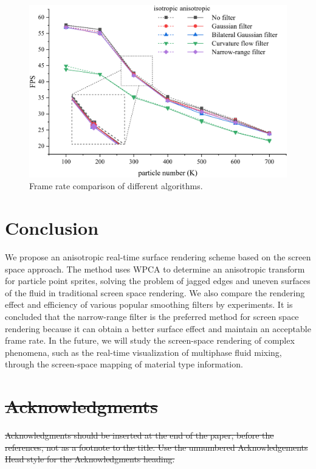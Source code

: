 \documentclass[times,twocolumn,final]{elsarticle}
\providecommand{\DIFdeltex}[1]{{\protect\color{red}\sout{#1}}}                      %
\providecommand{\DIFdelbegin}{} %
\providecommand{\DIFdelend}{} %
\providecommand{\DIFdel}[1]{\texorpdfstring{\DIFdeltex{#1}}{}} %
\begin{document}
\begin{figure}[!t]
    \centering
    \includegraphics[width=\linewidth]{figs/FPS.png}
    \caption{Frame rate comparison of different algorithms.}
    \label{fig:figure8}
\end{figure}

\section{Conclusion}
We propose an anisotropic real-time surface rendering scheme based on the screen space approach. The method uses WPCA to determine an anisotropic transform for particle point sprites, solving the problem of jagged edges and uneven surfaces of the fluid in traditional screen space rendering. We also compare the rendering effect and efficiency of various popular smoothing filters by experiments. It is concluded that the narrow-range filter is the preferred method for screen space rendering because it can obtain a better surface effect and maintain an acceptable frame rate. In the future, we will study the screen-space rendering of complex phenomena, such as the real-time visualization of multiphase fluid mixing, through the screen-space mapping of material type information.
\DIFdelbegin %

\section*{\DIFdel{Acknowledgments}}
\DIFdel{Acknowledgments should be inserted at the end of the paper, before the
references, not as a footnote to the title. Use the unnumbered
Acknowledgements Head style for the Acknowledgments heading.
}\DIFdelend %






\end{document}
